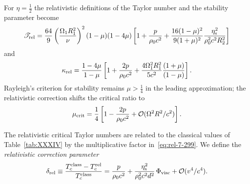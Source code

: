 For $\eta = \frac{1}{2}$ the relativistic definitions of the Taylor
number and the stability parameter become
\begin{equation}
\label{eq:rel-7-300}
\mathscr{T}_{\mathrm{rel}}
= \frac{64}{9}\left(\frac{\Omega_{1}R_{1}^{2}}{\nu}\right)^{2}
  (1-\mu)(1-4\mu)
  \left[1 + \frac{p}{\rho_0 c^{2}}
           + \frac{16(1-\mu)^{2}}{9(1+\mu)^{2}}
             \frac{\eta_{\mathrm{s}}^{2}}{\rho_0^{2}c^{2}R_{2}^{2}}
  \right]
\end{equation}
and
\begin{equation}
\label{eq:rel-7-301}
\kappa_{\mathrm{rel}}
= \frac{1-4\mu}{1-\mu}
  \left[1 + \frac{2p}{\rho_0 c^{2}}
           + \frac{4\Omega_{1}^{2}R_{1}^{2}}{5c^{2}}
             \frac{(1+\mu)}{(1-\mu)}
  \right].
\end{equation}
Rayleigh's criterion for stability remains $\mu > \frac{1}{4}$ in the
leading approximation; the relativistic correction shifts the critical
ratio to
\begin{equation}
\label{eq:rel-7-302}
\mu_{\mathrm{crit}} = \frac{1}{4}
  \left[1 - \frac{2p}{\rho_0 c^{2}}
           + \mathcal{O}(\Omega^{2}R^{2}/c^{2})\right].
\end{equation}

\medskip

The relativistic critical Taylor numbers are related to the classical
values of Table~\ref{tab:XXXIV} by the multiplicative factor
in~\eqref{eq:rel-7-299}.  We define the \emph{relativistic correction
parameter}
\begin{equation}
\label{eq:rel-7-303}
\delta_{\mathrm{rel}}
\equiv \frac{T_{c}^{\mathrm{class}} - T_{c}^{\mathrm{rel}}}
            {T_{c}^{\mathrm{class}}}
= \frac{p}{\rho_0 c^{2}}
  + \frac{\eta_{\mathrm{s}}^{2}}{\rho_0^{2}c^{2}d^{2}}\,\Phi_{\mathrm{visc}}
  + \mathcal{O}(v^{4}/c^{4}).
\end{equation}

